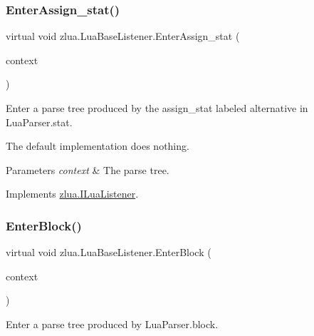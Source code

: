 \subsubsection{\texorpdfstring{Enter\+Assign\+\_\+stat()}{EnterAssign\_stat()}}
{\footnotesize\ttfamily virtual void zlua.\+Lua\+Base\+Listener.\+Enter\+Assign\+\_\+stat (\begin{DoxyParamCaption}\item[{\mbox{[}\+Not\+Null\mbox{]} \mbox{\hyperlink{classzlua_1_1_lua_parser_1_1_assign__stat_context}{Lua\+Parser.\+Assign\+\_\+stat\+Context}}}]{context }\end{DoxyParamCaption})\hspace{0.3cm}{\ttfamily [virtual]}}



Enter a parse tree produced by the {\ttfamily assign\+\_\+stat} labeled alternative in Lua\+Parser.\+stat. 

The default implementation does nothing.


\begin{DoxyParams}{Parameters}
{\em context} & The parse tree.\\
\hline
\end{DoxyParams}


Implements \mbox{\hyperlink{interfacezlua_1_1_i_lua_listener_a6c89bd1b72debe5db0a3bd633af3c6c9}{zlua.\+I\+Lua\+Listener}}.

\mbox{\label{classzlua_1_1_lua_base_listener_af7d5b6a200e1b7efe6886c7fdad9a0f3}} 
\subsubsection{\texorpdfstring{Enter\+Block()}{EnterBlock()}}
{\footnotesize\ttfamily virtual void zlua.\+Lua\+Base\+Listener.\+Enter\+Block (\begin{DoxyParamCaption}\item[{\mbox{[}\+Not\+Null\mbox{]} \mbox{\hyperlink{classzlua_1_1_lua_parser_1_1_block_context}{Lua\+Parser.\+Block\+Context}}}]{context }\end{DoxyParamCaption})\hspace{0.3cm}{\ttfamily [virtual]}}



Enter a parse tree produced by Lua\+Parser.\+block. 

